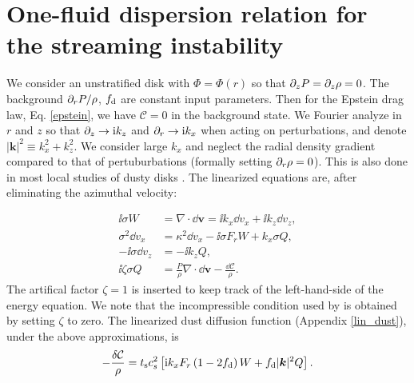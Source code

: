 \section{One-fluid dispersion relation for the streaming instability}\label{compressible_streaming}
We consider an unstratified disk with $\Phi = \Phi (r)$ so that $\partial_zP = \partial_z\rho =
0$. The background $\partial_rP/\rho$, $f_\mathrm{d}$ are constant
input parameters. Then for the Epstein drag law, Eq. \ref{epstein}, we
have $\mathcal{C}=0$ in the background state. 
We Fourier analyze in $r$ and $z$ so that $\partial_z\to \mathrm{i} k_z$ and
$\partial_r\to \mathrm{i} k_x$ when acting on perturbations, and denote $|\bm{k}|^2
\equiv k_x^2 + k_z^2$. We consider large $k_x$ and 
neglect the radial density gradient compared to that of pertuburbations 
(formally setting $\partial_r\rho=0$). This is also done in most local studies of
dusty disks \citep[e.g.][]{youdin07b}.  
The linearized
equations are, after eliminating the azimuthal velocity: 

\begin{align}
  \ii \sigma W &=\nabla\cdot \dd \bm{ v} = \ii k_x \dd v_x + \ii k_z \dd v_z,\label{streaming_mass}\\
    \sigma^2 \dd v_x &= \kappa^2 \dd v_x - \ii \sigma F_r W +
    k_x\sigma Q,\label{streaming_vx}\\
  -\ii\sigma\dd v_z &= -\ii k_zQ,\label{streaming_vz}\\
\ii \zeta \sigma  Q & = \frac{P}{\rho} \nabla \cdot \dd\bm{v}   -
  \frac{\dd \mathcal{C}}{\rho}. 
\end{align}
The artifical factor $\zeta = 1$  is inserted to keep track of the
left-hand-side of the energy equation. We note that the incompressible
condition used by \cite{jacquet11} is obtained by setting $\zeta$ to zero. 
The linearized dust diffusion
function (Appendix \ref{lin_dust}), 
under the above approximations, is 
\begin{align}
-\frac{\delta \mathcal{C}}{\rho}  = t_\mathrm{s} c_s^2 \left[\mathrm{i} k_x F_r\left( 1-2f_\mathrm{d}\right)
  W + f_\mathrm{d} |\bm{k}|^2 Q\right]. 
\end{align}

